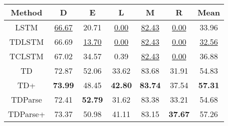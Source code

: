 \begin{tabular}{|c|c|c|c|c|c|c|}
\hline
Method  &   D &  E &  L &  M &  R  &   Mean \\
\hline
LSTM &  \underline{66.67} &     20.71 &    \underline{0.00} &     \underline{82.43} &        \underline{0.00} &  33.96 \\
\hline
TDLSTM &  66.69 &     \underline{13.70} &   \underline{0.00} &     \underline{82.43} &        \underline{0.00} &  \underline{32.56} \\
\hline
TCLSTM &  67.02 &     34.57 &    0.39 &     \underline{82.43} &        \underline{0.00} &  36.88 \\
\hline
TD &  72.87 &     52.06 &   33.62 &     83.68 &       31.91 &  54.83 \\
\hline
TD+ &  \textbf{73.99} &     48.45 &   \textbf{42.80} &     \textbf{83.74} &       37.54 &  \textbf{57.31} \\
\hline
TDParse &  72.41 &     \textbf{52.79} &   31.62 &     83.38 &       33.21 &  54.68 \\
\hline
TDParse+ &  73.37 &     50.98 &   41.11 &     83.15 &       \textbf{37.67} &  57.26 \\
\hline
\end{tabular}